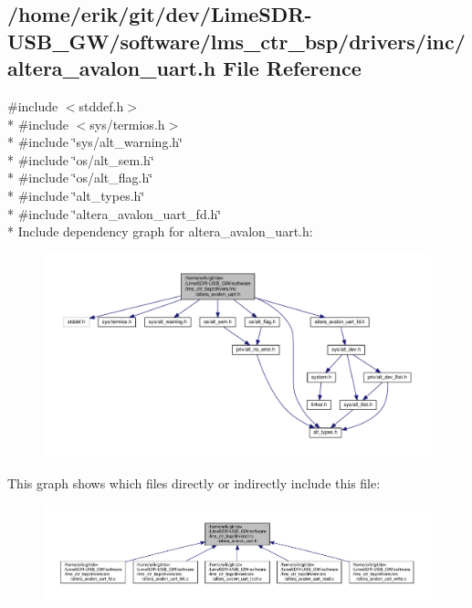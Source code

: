 \subsection{/home/erik/git/dev/\+Lime\+S\+D\+R-\/\+U\+S\+B\+\_\+\+G\+W/software/lms\+\_\+ctr\+\_\+bsp/drivers/inc/altera\+\_\+avalon\+\_\+uart.h File Reference}
\label{altera__avalon__uart_8h}
{\ttfamily \#include $<$stddef.\+h$>$}\\*
{\ttfamily \#include $<$sys/termios.\+h$>$}\\*
{\ttfamily \#include \char`\"{}sys/alt\+\_\+warning.\+h\char`\"{}}\\*
{\ttfamily \#include \char`\"{}os/alt\+\_\+sem.\+h\char`\"{}}\\*
{\ttfamily \#include \char`\"{}os/alt\+\_\+flag.\+h\char`\"{}}\\*
{\ttfamily \#include \char`\"{}alt\+\_\+types.\+h\char`\"{}}\\*
{\ttfamily \#include \char`\"{}altera\+\_\+avalon\+\_\+uart\+\_\+fd.\+h\char`\"{}}\\*
Include dependency graph for altera\+\_\+avalon\+\_\+uart.\+h\+:
\nopagebreak
\begin{figure}[H]
\begin{center}
\leavevmode
\includegraphics[width=350pt]{d5/d93/altera__avalon__uart_8h__incl}
\end{center}
\end{figure}
This graph shows which files directly or indirectly include this file\+:
\nopagebreak
\begin{figure}[H]
\begin{center}
\leavevmode
\includegraphics[width=350pt]{d6/d70/altera__avalon__uart_8h__dep__incl}
\end{center}
\end{figure}
